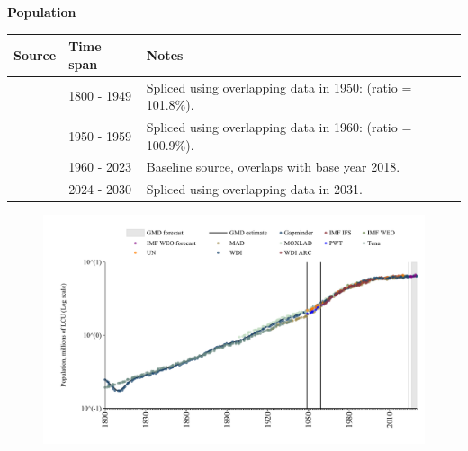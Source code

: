 \documentclass[12pt,a4paper,landscape]{article}
\begin{document}
\begin{adjustbox}{max totalsize={\paperwidth}{\paperheight},center}
\begin{minipage}[t][\textheight][t]{\textwidth}
\vspace*{0.5cm}
{}
\begin{center}
{\Large\bfseries Population}
\end{center}
\vspace{0.5cm}
\begin{table}[H]
\centering
\small
\begin{tabular}{|l|l|l|}
\hline
\textbf{Source} & \textbf{Time span} & \textbf{Notes} \\
\hline
\rowcolor{white}\cite{Gapminder}& 1800 - 1949 &Spliced using overlapping data in 1950: (ratio = 101.8\%). \\
\rowcolor{lightgray}\cite{IMF_IFS}& 1950 - 1959 &Spliced using overlapping data in 1960: (ratio = 100.9\%). \\
\rowcolor{white}\cite{WDI}& 1960 - 2023 &Baseline source, overlaps with base year 2018. \\
\rowcolor{lightgray}\cite{Gapminder}& 2024 - 2030 &Spliced using overlapping data in 2031. \\
\hline
\end{tabular}
\end{table}
\begin{figure}[H]
\centering
\includegraphics[width=\textwidth,height=0.6\textheight,keepaspectratio]{graphs/SLV_pop.pdf}
\end{figure}
\end{minipage}
\end{adjustbox}
\end{document}
